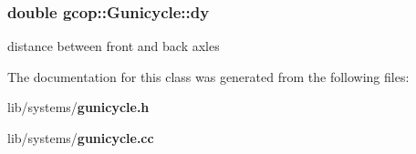 \subsubsection[{dy}]{\setlength{\rightskip}{0pt plus 5cm}double {\bf gcop\-::\-Gunicycle\-::dy}}\label{classgcop_1_1Gunicycle_adcd3484b2c39f28101aba15f36aead81}


distance between front and back axles 



\-The documentation for this class was generated from the following files\-:\begin{DoxyCompactItemize}
\item 
lib/systems/{\bf gunicycle.\-h}\item 
lib/systems/{\bf gunicycle.\-cc}\end{DoxyCompactItemize}
